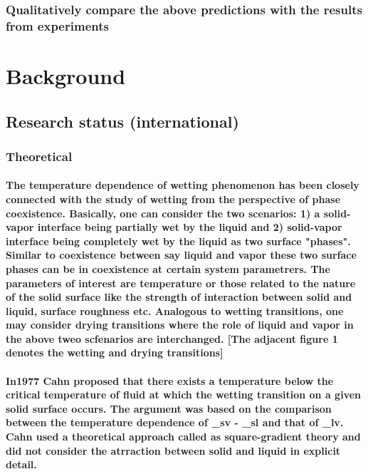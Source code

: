 \documentclass[a4paper,12pt,single,pdftex]{scrartcl}
\begin{document}
\label{ID_1671481601}\subsubsection{Qualitatively compare the above predictions with the results from experiments}

\label{ID_1110611260}\section{Background}

\label{ID_1392626561}\subsection{Research status (international)}

\label{ID_688891944}\subsubsection{Theoretical}

\label{ID_1917907773}\paragraph{The temperature dependence of wetting phenomenon has been closely connected with the study of wetting  from the perspective of phase coexistence. Basically, one can consider the two scenarios: 1) a solid-vapor interface being partially wet by the liquid and 2) solid-vapor interface being completely wet by the liquid as two surface "phases". Similar to coexistence between say liquid and vapor these two surface phases can be in coexistence at certain system parametrers. The parameters of interest are temperature or those related to the nature of the solid surface like the strength of interaction between solid and liquid, surface roughness etc. Analogous to wetting transitions, one may consider drying transitions where the role of liquid and vapor in the above tweo scfenarios are interchanged. [The adjacent figure 1 denotes the wetting and drying transitions]}

\label{ID_1762818689}\paragraph{In1977 Cahn proposed that there exists a temperature below the critical temperature of fluid at which the wetting transition on a given solid surface occurs. The argument was based on the comparison between the temperature dependence of \gamma_{sv} - \gamma_{sl}  and that of \gamma_{lv}. Cahn used a theoretical approach called as square-gradient theory and did not consider the atrraction between solid and liquid in explicit detail.}
\end{document}
